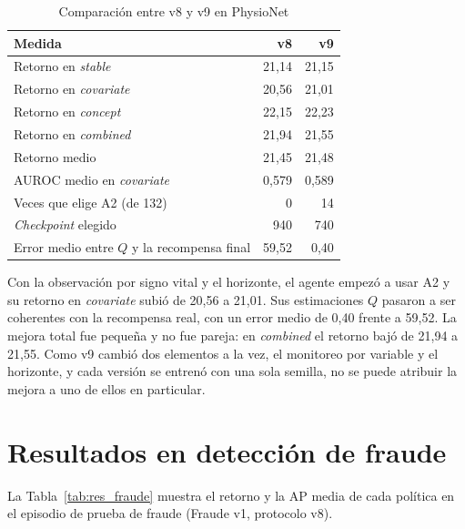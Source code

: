\begin{table}[H]
    \centering
    \caption{Comparación entre v8 y v9 en PhysioNet}
    \label{tab:res_v8_v9}
    \begin{tabular}{lrr}
        \toprule
        \textbf{Medida} & \textbf{v8} & \textbf{v9} \\
        \midrule
        Retorno en \textit{stable}                  & 21,14 & 21,15 \\
        Retorno en \textit{covariate}               & 20,56 & 21,01 \\
        Retorno en \textit{concept}                 & 22,15 & 22,23 \\
        Retorno en \textit{combined}                & 21,94 & 21,55 \\
        Retorno medio                               & 21,45 & 21,48 \\
        AUROC medio en \textit{covariate}           & 0,579 & 0,589 \\
        Veces que elige A2 (de 132)                 & 0     & 14 \\
        \textit{Checkpoint} elegido                 & 940   & 740 \\
        Error medio entre $Q$ y la recompensa final & 59,52 & 0,40 \\
        \bottomrule
    \end{tabular}
\end{table}

Con la observación por signo vital y el horizonte, el agente empezó a usar A2 y su retorno en
\textit{covariate} subió de 20,56 a 21,01. Sus estimaciones $Q$ pasaron a ser coherentes con la
recompensa real, con un error medio de 0,40 frente a 59,52. La mejora total fue pequeña y no fue
pareja: en \textit{combined} el retorno bajó de 21,94 a 21,55. Como v9 cambió dos elementos a la
vez, el monitoreo por variable y el horizonte, y cada versión se entrenó con una sola semilla, no
se puede atribuir la mejora a uno de ellos en particular.
\section{Resultados en detección de fraude}
\label{sec:res_fraude}

La Tabla~\ref{tab:res_fraude} muestra el retorno y la AP media de cada política en el episodio
de prueba de fraude (Fraude v1, protocolo v8).


